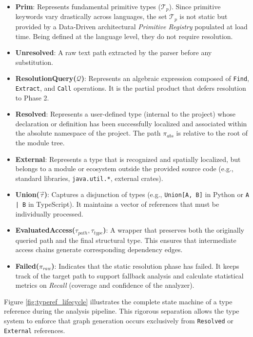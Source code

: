 \begin{itemize}
  \item \textbf{Prim}: Represents fundamental primitive types
    ($\mathcal{T}_{p}$). Since primitive keywords vary drastically
    across languages, the set $\mathcal{T}_{p}$ is not static but
    provided by a Data-Driven architectural \textit{Primitive
    Registry} populated at load time. Being defined at the language
    level, they do not require resolution.
  \item \textbf{Unresolved}: A raw text path extracted by the parser
    before any substitution.
  \item \textbf{ResolutionQuery($\mathcal{Q}$)}: Represents an
    algebraic expression composed of \texttt{Find}, \texttt{Extract},
    and \texttt{Call} operations. It is the partial product that
    defers resolution to Phase 2.
  \item \textbf{Resolved}: Represents a user-defined type (internal
    to the project) whose declaration or definition has been
    successfully localized and associated within the absolute
    namespace of the project. The path $\pi_{abs}$ is relative to the
    root of the module tree.
  \item \textbf{External}: Represents a type that is recognized and
    spatially localized, but belongs to a module or ecosystem outside
    the provided source code (e.g., standard libraries,
    \texttt{java.util.*}, external crates).
  \item \textbf{Union($\vec{\tau}$)}: Captures a disjunction of types
    (e.g., \texttt{Union[A, B]} in Python or \texttt{A | B} in
    TypeScript). It maintains a vector of references that must be
    individually processed.
  \item \textbf{EvaluatedAccess($\tau_{path}, \tau_{type}$)}: A
    wrapper that preserves both the originally queried path and the
    final structural type. This ensures that intermediate access
    chains generate corresponding dependency edges.
  \item \textbf{Failed($\pi_{raw}$)}: Indicates that the static
    resolution phase has failed. It keeps track of the target path to
    support fallback analysis and calculate statistical metrics on
    \textit{Recall} (coverage and confidence of the analyzer).
\end{itemize}

Figure \ref{fig:typeref_lifecycle} illustrates the complete state
machine of a type reference during the analysis pipeline. This
rigorous separation allows the type system to enforce that graph
generation occurs exclusively from \texttt{Resolved} or
\texttt{External} references.


